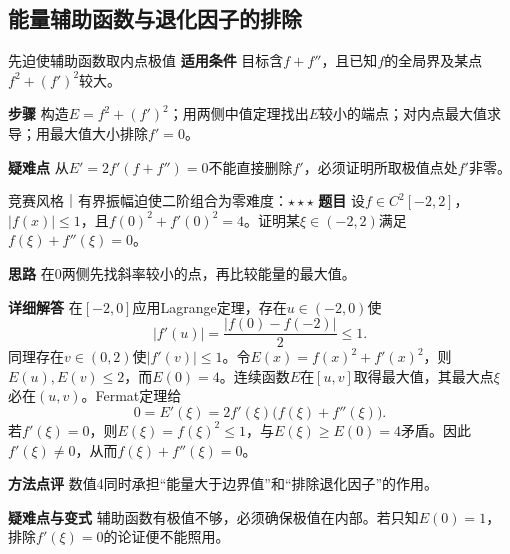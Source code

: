 \subsection{能量辅助函数与退化因子的排除}
\begin{method}{先迫使辅助函数取内点极值}
\textbf{适用条件} 目标含$f+f''$，且已知$f$的全局界及某点$f^2+(f')^2$较大。\par
\textbf{步骤} 构造$E=f^2+(f')^2$；用两侧中值定理找出$E$较小的端点；对内点最大值求导；用最大值大小排除$f'=0$。\par
\textbf{疑难点} 从$E'=2f'(f+f'')=0$不能直接删除$f'$，必须证明所取极值点处$f'$非零。
\end{method}
\begin{example}{竞赛风格｜有界振幅迫使二阶组合为零}{难度：$\star\star\star$}\label{cd:ex:energy}
\textbf{题目} 设$f\in C^2[-2,2]$，$|f(x)|\le1$，且$f(0)^2+f'(0)^2=4$。证明某$\xi\in(-2,2)$满足$f(\xi)+f''(\xi)=0$。\par
\textbf{思路} 在0两侧先找斜率较小的点，再比较能量的最大值。\par
\textbf{详细解答} 在$[-2,0]$应用Lagrange定理，存在$u\in(-2,0)$使
\[
 |f'(u)|=\dfrac{|f(0)-f(-2)|}{2}\le1.
\]
同理存在$v\in(0,2)$使$|f'(v)|\le1$。令$E(x)=f(x)^2+f'(x)^2$，则$E(u),E(v)\le2$，而$E(0)=4$。连续函数$E$在$[u,v]$取得最大值，其最大点$\xi$必在$(u,v)$。Fermat定理给
\[
 0=E'(\xi)=2f'(\xi)\bigl(f(\xi)+f''(\xi)\bigr).
\]
若$f'(\xi)=0$，则$E(\xi)=f(\xi)^2\le1$，与$E(\xi)\ge E(0)=4$矛盾。因此$f'(\xi)\ne0$，从而$f(\xi)+f''(\xi)=0$。\par
\textbf{方法点评} 数值4同时承担“能量大于边界值”和“排除退化因子”的作用。\par
\textbf{疑难点与变式} 辅助函数有极值不够，必须确保极值在内部。若只知$E(0)=1$，排除$f'(\xi)=0$的论证便不能照用。
\end{example}

